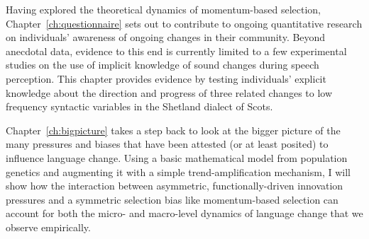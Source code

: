 Having explored the theoretical dynamics of momentum-based selection, Chapter~\ref{ch:questionnaire} sets out to contribute to ongoing quantitative research on individuals' awareness of ongoing changes in their community. Beyond anecdotal data, evidence to this end is currently limited to a few experimental studies on the use of implicit knowledge of sound changes during speech perception. This chapter provides evidence by testing individuals' explicit knowledge about the direction and progress of three related changes to low frequency syntactic variables in the Shetland dialect of Scots.

Chapter~\ref{ch:bigpicture} takes a step back to look at the bigger picture of the many pressures and biases that have been attested (or at least posited) to influence language change. Using a basic mathematical model from population genetics and augmenting it with a simple trend-amplification mechanism, I will show how the interaction between asymmetric, functionally-driven innovation pressures and a symmetric selection bias like momentum-based selection can account for both the micro- and macro-level dynamics of language change that we observe empirically.
